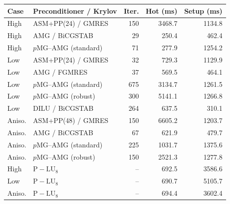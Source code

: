 \begin{tabular}{llrrr}
\toprule
Case & Preconditioner / Krylov & Iter. & Hot (ms) & Setup (ms) \\
\midrule
High & ASM+PP(24) / GMRES & 150 & 3468.7 & 1134.8 \\
High & AMG / BiCGSTAB & 29 & 250.4 & 462.4 \\
High & $p$MG--AMG (standard) & 71 & 277.9 & 1254.2 \\
Low & ASM+PP(24) / GMRES & 32 & 729.3 & 1129.9 \\
Low & AMG / FGMRES & 37 & 569.5 & 464.1 \\
Low & $p$MG--AMG (standard) & 675 & 3134.7 & 1261.5 \\
Low & $p$MG--AMG (robust) & 300 & 5141.1 & 1266.8 \\
Low & DILU / BiCGSTAB & 264 & 637.5 & 310.1 \\
Aniso. & ASM+PP(48) / GMRES & 150 & 6605.2 & 1203.7 \\
Aniso. & AMG / BiCGSTAB & 67 & 621.9 & 479.7 \\
Aniso. & $p$MG--AMG (standard) & 225 & 1031.7 & 1375.6 \\
Aniso. & $p$MG--AMG (robust) & 150 & 2521.3 & 1277.8 \\
High & $\mathrm{P\!-\!LU}_{8}$ & -- & 692.5 & 3586.6 \\
Low & $\mathrm{P\!-\!LU}_{8}$ & -- & 690.7 & 5105.7 \\
Aniso. & $\mathrm{P\!-\!LU}_{8}$ & -- & 694.4 & 3602.4 \\
\bottomrule
\end{tabular}
